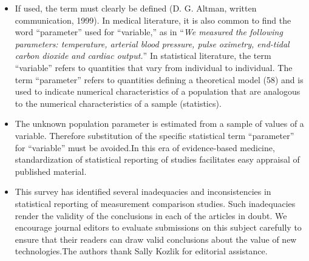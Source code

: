 \documentclass[]{article}
\begin{document}
\begin{itemize}
		\item If used, the term must clearly be defined (D. G. Altman, written communication, 1999). In medical literature, it is also common to find the word “parameter” used for “variable,” as in “\textit{We measured the following parameters: temperature, arterial blood pressure, pulse oximetry, end-tidal carbon dioxide and cardiac output.}” In statistical literature, the term “variable” refers to quantities that vary from individual to individual. The term “parameter” refers to quantities defining a theoretical model (58) and is used to indicate numerical characteristics of a population that are analogous to the numerical characteristics of a sample (statistics). 
		
		
		\item The unknown population parameter is estimated from a sample of values of a variable. Therefore substitution of the specific statistical term “parameter” for “variable” must be avoided.In this era of evidence-based medicine, standardization of statistical reporting of studies facilitates easy appraisal of published material. 
		
		\item This survey has identified several inadequacies and inconsistencies in statistical reporting of measurement comparison studies. Such inadequacies render the validity of the conclusions in each of the articles in doubt. We encourage journal editors to evaluate submissions on this subject carefully to ensure that their readers can draw valid conclusions about the value of new technologies.The authors thank Sally Kozlik for editorial assistance.
	\end{itemize}
\end{document}

